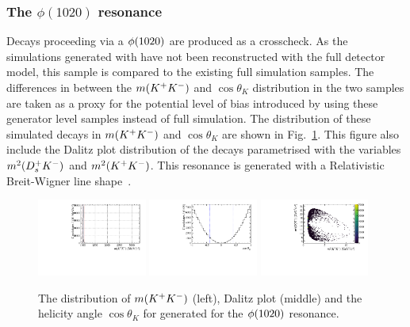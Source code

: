 \subsubsection{The $\phi(1020)$ resonance} 
Decays proceeding via a $\phi(1020)$ are produced as a crosscheck. As the simulations generated with \laurapp have not been reconstructed with the full \lhcb detector model, this sample is compared to the existing full simulation samples. The differences in between the $m({{K}^+}{{K}^-})$ and $\cos\theta_{K}$ distribution in the two samples are taken as a proxy for the potential level of bias introduced by using these generator level samples instead of full simulation. The distribution of these simulated decays in $m({{K}^+}{{K}^-})$ and $\cos\theta_{K}$ are shown in Fig.~\ref{fig:DsKK_model_phi1020}. This figure also include the Dalitz plot distribution of the decays parametrised with the variables $m^{2}({{D}^+_{s}}{{K}^-})$ and $m^{2}({{K}^+}{{K}^-})$.
This resonance is generated with a Relativistic Breit-Wigner line shape~\cite{RelBWPhysRev.49.519}.
\begin{figure}[!h]
   \centering   
   \includegraphics[width=0.32\textwidth]{figs/B2DsPhi/phi_phi_mass.pdf}
   \includegraphics[width=0.32\textwidth]{figs/B2DsPhi/phi_Helicity.pdf}
   \includegraphics[width=0.32\textwidth]{figs/B2DsPhi/phi_Dalitz_plot.pdf}
   \caption{The distribution of $m({{K}^+}{{K}^-})$ (left), Dalitz plot (middle) and the helicity angle $\cos\theta_{K}$ for generated for the $\phi(1020)$ resonance.} 
   \label{fig:DsKK_model_phi1020}   
\end{figure}

